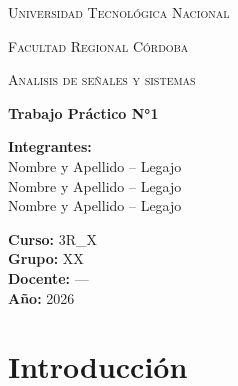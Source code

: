 \documentclass[12pt,a4paper]{article}
\begin{document}
\begin{titlepage}
    \centering

    {\scshape\LARGE Universidad Tecnológica Nacional \par}
    \vspace{0.3cm}
    {\scshape\Large Facultad Regional Córdoba \par}
    \vspace{1.5cm}

    {\scshape\Large Analisis de señales y sistemas \par}
    \vspace{2cm}

    {\Huge\bfseries Trabajo Práctico N°1 \par}
    
    \vspace{2cm}

    \begin{flushleft}
    \textbf{Integrantes:} \\
    Nombre y Apellido -- Legajo \\
    Nombre y Apellido -- Legajo \\
    Nombre y Apellido -- Legajo \\

    \vspace{0.5cm}

    \textbf{Curso:} 3R\_X \\
    \textbf{Grupo:} XX \\
    \textbf{Docente:} --- \\
    \textbf{Año:} 2026 \\
    \end{flushleft}

    \vfill

\end{titlepage}
\thispagestyle{empty}

\vspace{1cm}

\tableofcontents
\newpage

\section {Introducción}


\vspace{0.5cm}



\end{document}
